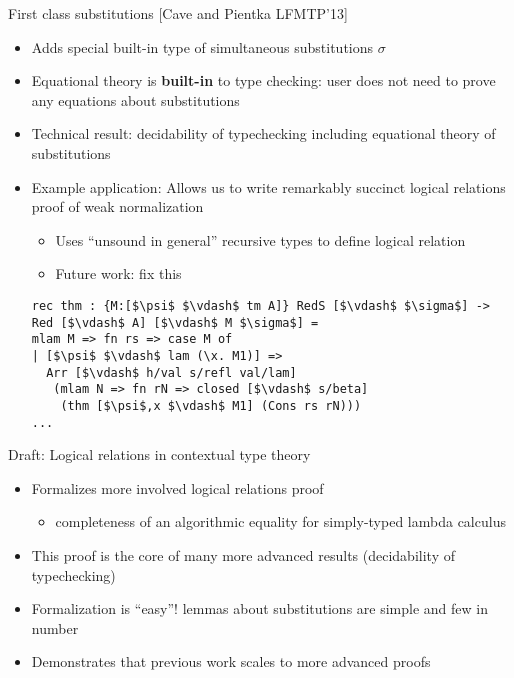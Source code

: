 \documentclass[usenames,dvipsnames]{beamer}
\begin{document}
\begin{frame}[fragile]{First class substitutions [Cave and Pientka LFMTP'13]}
\begin{itemize}
\item Adds special built-in type of simultaneous substitutions $\sigma$
\item Equational theory is \textbf{built-in} to type checking: user does not need to prove any equations about substitutions
\item Technical result: decidability of typechecking including equational theory of substitutions
\item Example application: Allows us to write remarkably succinct logical relations proof of weak normalization
\begin{itemize}
\item Uses ``unsound in general'' recursive types to define logical relation
\item Future work: fix this
\end{itemize}
\begin{lstlisting}
rec thm : {M:[$\psi$ $\vdash$ tm A]} RedS [$\vdash$ $\sigma$] -> Red [$\vdash$ A] [$\vdash$ M $\sigma$] =
mlam M => fn rs => case M of
| [$\psi$ $\vdash$ lam (\x. M1)] =>
  Arr [$\vdash$ h/val s/refl val/lam]
   (mlam N => fn rN => closed [$\vdash$ s/beta]
    (thm [$\psi$,x $\vdash$ M1] (Cons rs rN)))
...
\end{lstlisting}
\end{itemize}
\end{frame}

\begin{frame}{Draft: Logical relations in contextual type theory}
\begin{itemize}
\item Formalizes more involved logical relations proof
\begin{itemize}
\item completeness of an algorithmic equality for simply-typed lambda calculus
\end{itemize}
\item This proof is the core of many more advanced results (decidability of typechecking)
\item Formalization is ``easy''! lemmas about substitutions are simple and few in number
\item Demonstrates that previous work scales to more advanced proofs
\end{itemize}
\end{frame}
\end{document}
